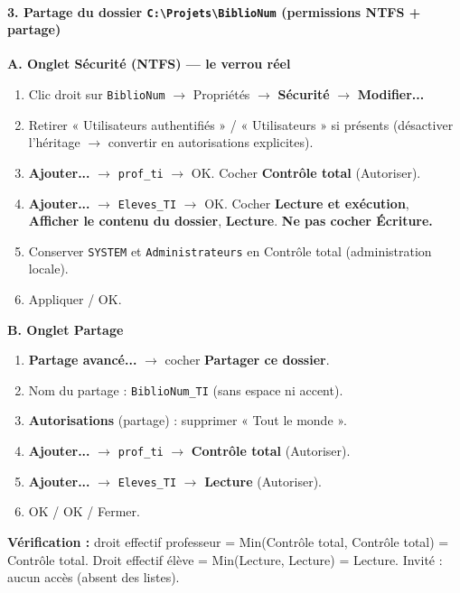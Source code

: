 \documentclass[11pt]{article}
\begin{document}
\begin{exoresolu}
\paragraph{3. Partage du dossier \texttt{C:\textbackslash Projets\textbackslash BiblioNum} (permissions NTFS + partage)}

\textbf{A. Onglet Sécurité (NTFS) — le verrou réel}
\begin{enumerate}
    \item Clic droit sur \texttt{BiblioNum} $\rightarrow$ Propriétés $\rightarrow$ \textbf{Sécurité} $\rightarrow$ \textbf{Modifier...}
    \item Retirer « Utilisateurs authentifiés » / « Utilisateurs » si présents (désactiver l'héritage $\rightarrow$ convertir en autorisations explicites).
    \item \textbf{Ajouter...} $\rightarrow$ \texttt{prof\_ti} $\rightarrow$ OK. Cocher \textbf{Contrôle total} (Autoriser).
    \item \textbf{Ajouter...} $\rightarrow$ \texttt{Eleves\_TI} $\rightarrow$ OK. Cocher \textbf{Lecture et exécution}, \textbf{Afficher le contenu du dossier}, \textbf{Lecture}. \textbf{Ne pas cocher Écriture.}
    \item Conserver \texttt{SYSTEM} et \texttt{Administrateurs} en Contrôle total (administration locale).
    \item Appliquer / OK.
\end{enumerate}

\textbf{B. Onglet Partage}
\begin{enumerate}
    \item \textbf{Partage avancé...} $\rightarrow$ cocher \textbf{Partager ce dossier}.
    \item Nom du partage : \texttt{BiblioNum\_TI} (sans espace ni accent).
    \item \textbf{Autorisations} (partage) : supprimer « Tout le monde ».
    \item \textbf{Ajouter...} $\rightarrow$ \texttt{prof\_ti} $\rightarrow$ \textbf{Contrôle total} (Autoriser).
    \item \textbf{Ajouter...} $\rightarrow$ \texttt{Eleves\_TI} $\rightarrow$ \textbf{Lecture} (Autoriser).
    \item OK / OK / Fermer.
\end{enumerate}
\textbf{Vérification :} droit effectif professeur = Min(Contrôle total, Contrôle total) = Contrôle total. Droit effectif élève = Min(Lecture, Lecture) = Lecture. Invité : aucun accès (absent des listes).


\end{exoresolu}
\end{document}
